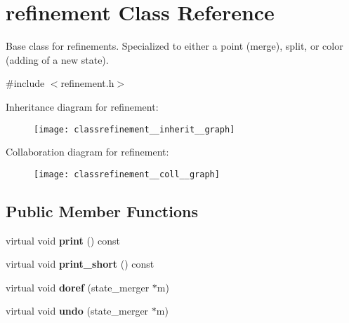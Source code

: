 \hypertarget{classrefinement}{}\section{refinement Class Reference}
\label{classrefinement}


Base class for refinements. Specialized to either a point (merge), split, or color (adding of a new state).  




{\ttfamily \#include $<$refinement.\+h$>$}



Inheritance diagram for refinement\+:\nopagebreak
\begin{figure}[H]
\begin{center}
\leavevmode
\texttt{[image: classrefinement\_\_inherit\_\_graph]}
\end{center}
\end{figure}


Collaboration diagram for refinement\+:\nopagebreak
\begin{figure}[H]
\begin{center}
\leavevmode
\texttt{[image: classrefinement\_\_coll\_\_graph]}
\end{center}
\end{figure}
\subsection*{Public Member Functions}
\begin{DoxyCompactItemize}
\item 
virtual void {\bfseries print} () const \hypertarget{classrefinement_a0ee933176436975fb05a2edb04ebd819}{}\label{classrefinement_a0ee933176436975fb05a2edb04ebd819}

\item 
virtual void {\bfseries print\+\_\+short} () const \hypertarget{classrefinement_a46046c9842832db4cd5a9310972dd898}{}\label{classrefinement_a46046c9842832db4cd5a9310972dd898}

\item 
virtual void {\bfseries doref} (state\+\_\+merger $\ast$m)\hypertarget{classrefinement_a3927f962be48969209071fff60a92e6d}{}\label{classrefinement_a3927f962be48969209071fff60a92e6d}

\item 
virtual void {\bfseries undo} (state\+\_\+merger $\ast$m)\hypertarget{classrefinement_a77bfd65c7d57546bfeb04ba7dacbf066}{}\label{classrefinement_a77bfd65c7d57546bfeb04ba7dacbf066}

\end{DoxyCompactItemize}
